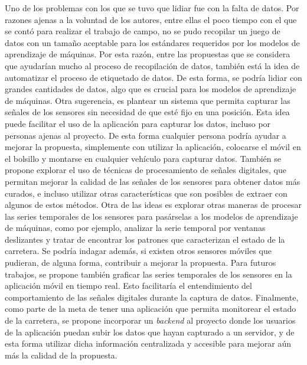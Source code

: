 \begin{recomendations}
	Uno de los problemas con los que se tuvo que lidiar fue con la falta de datos. Por razones ajenas a la voluntad de los autores,
	entre ellas el poco tiempo con el que se contó para realizar el trabajo de campo, no se pudo recopilar un juego de datos con un 
	tamaño aceptable para los estándares requeridos por los modelos de aprendizaje de máquinas. Por esta razón, entre las propuestas
	que se considera que ayudarían mucho al proceso de recopilación de datos, también está la idea de automatizar el proceso de
	etiquetado de datos. De esta forma, se podría lidiar con grandes cantidades de datos, algo que es crucial para los modelos de
	aprendizaje de máquinas. Otra sugerencia, es plantear un sistema que permita capturar las señales de los sensores sin necesidad de que
	esté fijo en una posición. Esta idea puede facilitar el uso de la aplicación para capturar los datos, incluso por personas ajenas
	al proyecto. De esta forma cualquier persona podría ayudar a mejorar la propuesta, simplemente con utilizar la aplicación, colocarse
	el móvil en el bolsillo y montarse en cualquier vehículo para capturar datos. También se propone explorar el uso de técnicas de
	procesamiento de señales digitales, que permitan mejorar la calidad de las señales de los sensores para obtener datos más curados,
	e incluso utilizar otras características que son posibles de extraer con algunos de estos métodos. Otra de las ideas es explorar 
	otras maneras de procesar las series temporales de los sensores para pasárselas a los modelos de aprendizaje de máquinas,
	como por ejemplo, analizar la serie temporal por ventanas deslizantes y tratar de encontrar los patrones que caracterizan el estado
	de la carretera. Se podría indagar además, si existen otros sensores móviles que pudieran, de alguna forma, contribuir a mejorar la
	propuesta. Para futuros trabajos, se propone también graficar las series temporales de los sensores en la aplicación móvil en tiempo
	real. Esto facilitaría el entendimiento del comportamiento de las señales digitales durante la captura de datos. Finalmente, como parte 
	de la meta de tener una aplicación que permita monitorear el estado de la carretera, se propone incorporar un \emph{backend} al proyecto
	donde los usuarios de la aplicación puedan subir los datos que hayan capturado a un servidor, y de esta forma utilizar dicha información 
	centralizada y accesible para mejorar aún más la calidad de la propuesta.
\end{recomendations}
